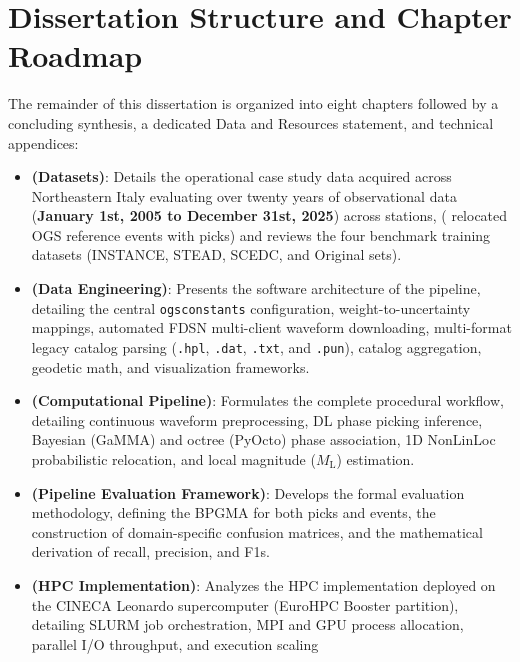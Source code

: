 \section{Dissertation Structure and Chapter Roadmap}
\label{sec:roadmap}

The remainder of this dissertation is organized into eight chapters followed by
a concluding synthesis, a dedicated Data and Resources statement, and technical
appendices:
\begin{itemize}
  \item \textbf{ (Datasets)}: Details the operational case
    study data acquired across Northeastern Italy evaluating over twenty years
    of observational data (\textbf{January 1st, 2005 to December 31st, 2025})
    across  stations, (
    relocated \ac{OGS} reference events with  picks) and
    reviews the four benchmark training datasets (\ac{INSTANCE}, \ac{STEAD},
    \ac{SCEDC}, and Original sets).
  \item \textbf{ (Data Engineering)}: Presents the
    software architecture of the pipeline, detailing the central
    \texttt{ogsconstants} configuration, weight-to-uncertainty mappings,
    automated \ac{FDSN} multi-client waveform downloading, multi-format legacy
    catalog parsing (\texttt{.hpl}, \texttt{.dat}, \texttt{.txt}, and
    \texttt{.pun}), catalog aggregation, geodetic math, and visualization
    frameworks.
  \item \textbf{ (Computational Pipeline)}:
    Formulates the complete procedural workflow, detailing continuous waveform
    preprocessing, \ac{DL} phase picking inference, Bayesian (\ac{GaMMA})
    and octree (\ac{PyOcto}) phase association, 1D \ac{NonLinLoc} probabilistic
    relocation, and local magnitude ($M_{\mathrm{L}}$) estimation.
  \item \textbf{ (Pipeline Evaluation
    Framework)}: Develops the formal evaluation methodology, defining the
    \acf{BPGMA} for both picks and events, the construction of domain-specific
    confusion matrices, and the mathematical derivation of recall, precision,
    and \acp{F1}.
  \item \textbf{ (HPC Implementation)}: Analyzes the \ac{HPC}
    implementation deployed on the \ac{CINECA} Leonardo supercomputer (EuroHPC
    Booster partition), detailing SLURM job orchestration, \ac{MPI} and
    \ac{GPU} process allocation, parallel I/O throughput, and execution scaling

\end{itemize}
